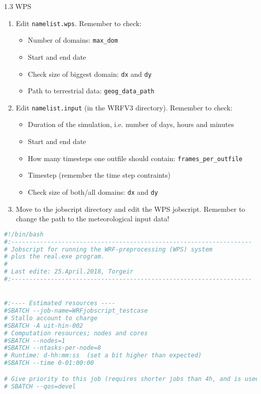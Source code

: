 \documentclass[xcolor=table]{beamer}
\begin{document}
\begin{frame}[fragile, allowframebreaks=.95, t]{1.3 WPS}
\begin{enumerate}
	\item Edit \texttt{namelist.wps}. Remember to check:
	\begin{itemize}
		\item Number of domains: \texttt{max\_dom}
		\item Start and end date
		\item Check size of biggest domain: \texttt{dx} and \texttt{dy}
		\item Path to terrestrial data: \texttt{geog\_data\_path}
	\end{itemize}
	\item Edit \texttt{namelist.input} (in the WRFV3 directory). Remember to check:
	\begin{itemize}
		\item Duration of the simulation, i.e. number of days, hours and minutes
		\item Start and end date
		\item How many timesteps one outfile should contain: \texttt{frames\_per\_outfile}
		\item Timestep (remember the time step contraints)
		\item Check size of both/all domains: \texttt{dx} and \texttt{dy}
	\end{itemize}
	\item Move to the jobscript directory and edit the WPS jobscript. Remember to change the path to the meteorological input data!
\end{enumerate}
\begin{lstlisting}[backgroundcolor = \color{light-gray}, language=bash]
#!/bin/bash
#:-------------------------------------------------------------------
# Jobscript for running the WRF-preprocessing (WPS) system 
# plus the real.exe program. 
#
# Last edite: 25.April.2018, Torgeir
#:-------------------------------------------------------------------


#:---- Estimated resources ----
#SBATCH --job-name=WRFjobscript_testcase
# Stallo account to charge
#SBATCH -A uit-hin-002
# Computation resources; nodes and cores
#SBATCH --nodes=1
#SBATCH --ntasks-per-node=8
# Runtime: d-hh:mm:ss  (set a bit higher than expected)
#SBATCH --time 0-01:00:00

# Give priority to this job (requires shorter jobs than 4h, and is used for testing scripts)
# SBATCH --qos=devel


\end{lstlisting}
\end{frame}
\end{document}
